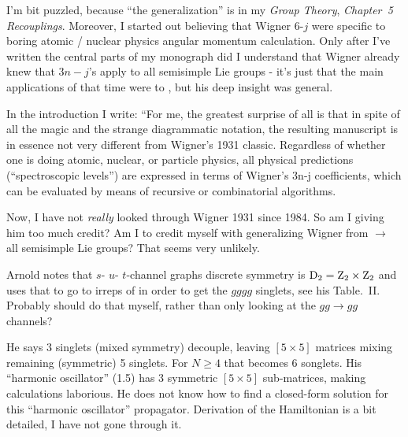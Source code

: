 \begin{description}
I'm bit puzzled, because ``the generalization'' is in my \emph{Group
Theory},
 {\em
Chapter~5} {\em Recouplings}. Moreover, I started out believing that
Wigner 6-$j$ were specific to  boring atomic / nuclear physics angular
momentum calculation. Only after I've written the central parts of my
monograph did I understand that Wigner already knew that $3n-j$'s apply
to all semisimple Lie groups - it's just that the main applications of
that time were to , but his deep insight was general.

In the introduction I write:
``For me, the greatest surprise of all is that in spite of all the magic
and the strange diagrammatic notation, the resulting manuscript is in
essence not very different from Wigner's 1931 classic. Regardless of
whether one is doing atomic, nuclear, or particle physics, all physical
predictions (``spectroscopic levels'') are expressed in terms of
Wigner's 3n-j coefficients, which can be evaluated by means of recursive or
combinatorial algorithms.

Now, I have not {\em really} looked through Wigner 1931 since 1984. So am
I giving him too much credit? Am I to credit myself with generalizing
Wigner from  $\to$ all semisimple Lie groups? That seems very
unlikely.

Arnold notes that $s$- $u$- $t$-channel graphs discrete symmetry is
$\textrm{D}_{2}=\textrm{Z}_{2}\times\textrm{Z}_{2}$ and uses that to go to irreps of  in
order to get the $gggg$ singlets, see his Table.~II.
Probably should do that myself, rather
than only looking at the $gg\to{gg}$ channels?

He says 3 singlets (mixed symmetry) decouple, leaving $[5\!\times\!5]$
matrices mixing remaining (symmetric) 5 singlets. For $N\geq4$ that
becomes 6 songlets. His ``harmonic oscillator'' (1.5) has 3 symmetric
$[5\!\times\!5]$ sub-matrices, making calculations laborious. He does not
know how to find a closed-form solution for this ``harmonic oscillator''
propagator. Derivation of the Hamiltonian is a bit detailed, I have not
gone through it.


\end{description}


\printbibliography[heading=subbibintoc,title={References}]
